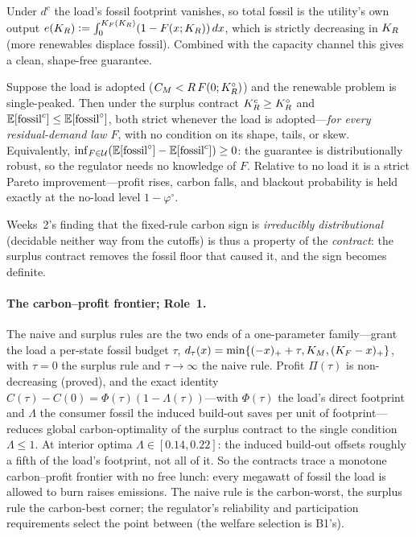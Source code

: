Under $d^{c}$ the load's fossil footprint vanishes, so total fossil is the utility's own
output $e(K_R)\vcentcolon=\int_0^{K_F(K_R)}(1-F(x;K_R))\,dx$, which is strictly decreasing in
$K_R$ (more renewables displace fossil). Combined with the capacity channel this gives a
clean, shape-free guarantee.

\begin{theorem}\label{intg-thm:decarb}
Suppose the load is adopted ($C_M<R\,F(0;K_R^{\circ})$) and the renewable problem is
single-peaked. Then under the surplus contract $K_R^{c}\ge K_R^{\circ}$ and
$\mathbb{E}[\text{fossil}^{c}]\le\mathbb{E}[\text{fossil}^{\circ}]$, both strict whenever the load is
adopted---\emph{for every residual-demand law $F$}, with no condition on its shape, tails,
or skew. Equivalently, $\inf_{F\in\mathcal U}(\mathbb{E}[\text{fossil}^{\circ}]-\mathbb{E}[\text{fossil}^{c}])\ge0$:
the guarantee is distributionally robust, so the regulator needs no knowledge of $F$.
Relative to no load it is a strict Pareto improvement---profit rises, carbon falls, and
blackout probability is held exactly at the no-load level $1-\varphi^{\circ}$.
\end{theorem}

Weeks~2's finding that the fixed-rule carbon sign is \emph{irreducibly distributional}
(decidable neither way from the cutoffs) is thus a property of the \emph{contract}: the
surplus contract removes the fossil floor that caused it, and the sign becomes definite.

\paragraph{The carbon--profit frontier; Role~1.} The naive and surplus rules are the two
ends of a one-parameter family---grant the load a per-state fossil budget $\tau$,
$d_{\tau}(x)=\min\{(-x)_++\tau,K_M,(K_F-x)_+\}$, with $\tau=0$ the surplus rule and
$\tau\to\infty$ the naive rule. Profit $\Pi(\tau)$ is non-decreasing (proved), and the
exact identity $C(\tau)-C(0)=\Phi(\tau)(1-\Lambda(\tau))$---with $\Phi(\tau)$ the load's
direct footprint and $\Lambda$ the consumer fossil the induced build-out saves per unit
of footprint---reduces global carbon-optimality of the surplus contract to the single
condition $\Lambda\le1$. At interior optima $\Lambda\in[0.14,0.22]$: the induced build-out offsets
roughly a fifth of the load's footprint, not all of it. So the
contracts trace a monotone carbon--profit frontier with no free lunch: every megawatt of
fossil the load is allowed to burn raises emissions. The naive rule is the carbon-worst,
the surplus rule the carbon-best corner; the regulator's reliability and participation
requirements select the point between (the welfare selection is B1's).



